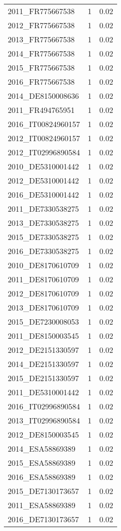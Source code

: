 \begin{table*}[htbp]
\begin{tabular}{lrr}
2011_FR775667538 & 1 & 0.02 \\
2012_FR775667538 & 1 & 0.02 \\
2013_FR775667538 & 1 & 0.02 \\
2014_FR775667538 & 1 & 0.02 \\
2015_FR775667538 & 1 & 0.02 \\
2016_FR775667538 & 1 & 0.02 \\
2014_DE8150008636 & 1 & 0.02 \\
2011_FR494765951 & 1 & 0.02 \\
2016_IT00824960157 & 1 & 0.02 \\
2012_IT00824960157 & 1 & 0.02 \\
2012_IT02996890584 & 1 & 0.02 \\
2010_DE5310001442 & 1 & 0.02 \\
2012_DE5310001442 & 1 & 0.02 \\
2016_DE5310001442 & 1 & 0.02 \\
2011_DE7330538275 & 1 & 0.02 \\
2013_DE7330538275 & 1 & 0.02 \\
2015_DE7330538275 & 1 & 0.02 \\
2016_DE7330538275 & 1 & 0.02 \\
2010_DE8170610709 & 1 & 0.02 \\
2011_DE8170610709 & 1 & 0.02 \\
2012_DE8170610709 & 1 & 0.02 \\
2013_DE8170610709 & 1 & 0.02 \\
2015_DE7230008053 & 1 & 0.02 \\
2011_DE8150003545 & 1 & 0.02 \\
2012_DE2151330597 & 1 & 0.02 \\
2014_DE2151330597 & 1 & 0.02 \\
2015_DE2151330597 & 1 & 0.02 \\
2011_DE5310001442 & 1 & 0.02 \\
2016_IT02996890584 & 1 & 0.02 \\
2013_IT02996890584 & 1 & 0.02 \\
2012_DE8150003545 & 1 & 0.02 \\
2014_ESA58869389 & 1 & 0.02 \\
2015_ESA58869389 & 1 & 0.02 \\
2016_ESA58869389 & 1 & 0.02 \\
2015_DE7130173657 & 1 & 0.02 \\
2011_ESA58869389 & 1 & 0.02 \\
2016_DE7130173657 & 1 & 0.02 \\

\end{tabular}
\end{table*}
